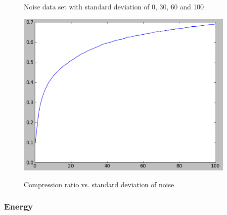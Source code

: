 \begin{figure}[ht]
\centering
{}
\hfill
{}
\hfill
{}
\hfill
{}
\caption{Noise data set with standard deviation of 0, 30, 60 and 100}
\label{fig:noiseset}
\end{figure}  

\begin{figure}
  \centering
  \includegraphics[width=0.95\textwidth]{figures/noiseall.png} 
  \label{fig:noiseall}
  \caption{Compression ratio vs. standard deviation of noise}
\end{figure}

\subsubsection{Energy}
